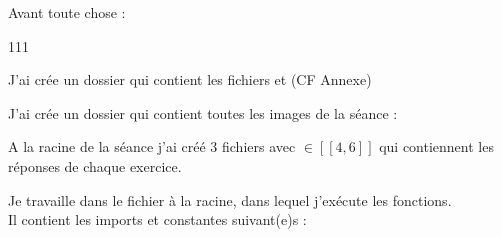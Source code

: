 Avant toute chose :
\begin{dinglist}{111}
      \item J'ai crée un dossier  qui contient les fichiers
       et  (CF Annexe)

      \item J'ai crée un dossier  qui contient toutes les images
      de la séance :

      \item A la racine de la séance j'ai créé 3 fichiers 
      avec $\in [\![4, 6]\!]$ qui contiennent les réponses de chaque
      exercice.

      \item Je travaille dans le fichier  à la racine, dans lequel
      j'exécute les fonctions.\\
      Il contient les imports et constantes suivant(e)s :
\end{dinglist}
